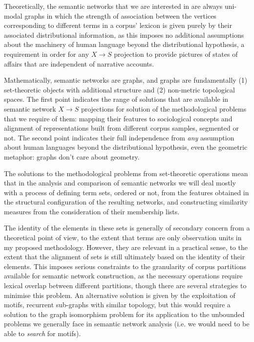 Theoretically, the semantic networks that we are interested in are always uni-modal graphs in which the strength of association between the vertices corresponding to different terms in a corpus' lexicon is given purely by their associated distributional information, as this imposes no additional assumptions about the machinery of human language beyond the distributional hypothesis, a requirement in order for any $X \rightarrow S$ projection to provide pictures of states of affairs that are independent of narrative accounts.

Mathematically, semantic networks are graphs, and graphs are fundamentally (1) set-theoretic objects with additional structure and (2) non-metric topological spaces.
The first point indicates the range of solutions that are available in semantic network $X \rightarrow S$ projections for solution of the methodological problems that we require of them: mapping their features to sociological concepts and alignment of representations built from different corpus samples, segmented or not.
The second point indicates their full independence from \emph{any} assumption about human languages beyond the distributional hypothesis, even the geometric metaphor: graphs don't care about geometry.

The solutions to the methodological problems from set-theoretic operations mean that in the analysis and comparison of semantic networks we will deal mostly with a process of defining term sets, ordered or not, from the features obtained in the structural configuration of the resulting networks, and constructing similarity measures from the consideration of their membership lists.

The identity of the elements in these sets is generally of secondary concern from a theoretical point of view, to the extent that terms are only observation units in my proposed methodology.
However, they are relevant in a practical sense, to the extent that the alignment of sets is still ultimately based on the identity of their elements.
This imposes serious constraints to the granularity of corpus partitions available for semantic network construction, as the necessary operations require lexical overlap between different partitions, though there are several strategies to minimise this problem.
An alternative solution is given by the exploitation of motifs, recurrent sub-graphs with similar topology, but this would require a solution to the graph isomorphism problem for its application to the unbounded problems we generally face in semantic network analysis (i.e. we would need to be able to \emph{search} for motifs).

